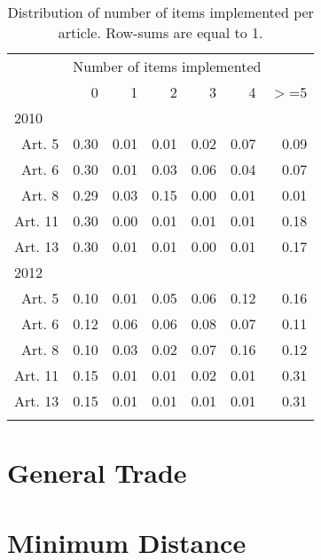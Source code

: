 \documentclass[10pt]{article}
\begin{document}
\begin{table}[ht]
\centering
\begin{tabular}{rrrrrrr}
  \toprule
&  \multicolumn{6}{l}{Number of items implemented}\\
 &  0 &  1 &  2 &  3 &  4 & $>$=5 \\ 
  \midrule
\multicolumn{6}{l}{2010}\\
Art. 5 & 0.30 & 0.01 & 0.01 & 0.02 & 0.07 & 0.09 \\ 
  Art. 6 & 0.30 & 0.01 & 0.03 & 0.06 & 0.04 & 0.07 \\ 
  Art. 8 & 0.29 & 0.03 & 0.15 & 0.00 & 0.01 & 0.01 \\ 
  Art. 11 & 0.30 & 0.00 & 0.01 & 0.01 & 0.01 & 0.18 \\ 
  Art. 13 & 0.30 & 0.01 & 0.01 & 0.00 & 0.01 & 0.17 \\ 
   \midrule
\multicolumn{6}{l}{2012}\\
Art. 5 & 0.10 & 0.01 & 0.05 & 0.06 & 0.12 & 0.16 \\ 
  Art. 6 & 0.12 & 0.06 & 0.06 & 0.08 & 0.07 & 0.11 \\ 
  Art. 8 & 0.10 & 0.03 & 0.02 & 0.07 & 0.16 & 0.12 \\ 
  Art. 11 & 0.15 & 0.01 & 0.01 & 0.02 & 0.01 & 0.31 \\ 
  Art. 13 & 0.15 & 0.01 & 0.01 & 0.01 & 0.01 & 0.31 \\ 
   \bottomrule
\multicolumn{6}{l}{}\\
\end{tabular}
\caption{Distribution of number of items implemented per article. Row-sums are equal to 1.} 
\end{table}

\pagebreak

\clearpage\section{General Trade}







\clearpage\section{Minimum Distance}
\end{document}
